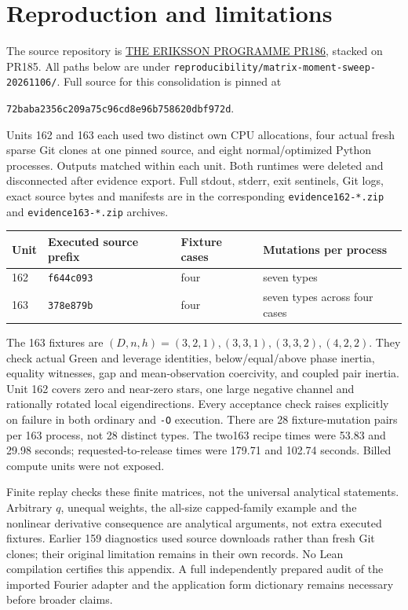 \documentclass[11pt,a4paper]{article}
\begin{document}
\section{Reproduction and limitations}\label{sec:evidence}
The source repository is
\href{https://github.com/lluiseriksson/THE-ERIKSSON-PROGRAMME/pull/186}{THE ERIKSSON PROGRAMME PR186},
stacked on PR185. All paths below are under
\texttt{reproducibility/matrix-moment-sweep-20261106/}.
Full source for this consolidation is pinned at
\begin{center}\small\texttt{72baba2356c209a75c96cd8e96b758620dbf972d}.\end{center}
Units 162 and 163 each used two distinct own CPU allocations, four actual
fresh sparse Git clones at one pinned source, and eight normal/optimized
Python processes. Outputs matched within each unit. Both runtimes were
deleted and disconnected after evidence export. Full stdout, stderr, exit
sentinels, Git logs, exact source bytes and manifests are in the corresponding
\texttt{evidence162-*.zip} and \texttt{evidence163-*.zip} archives.

\begin{center}\small
\begin{tabular}{llll}
\toprule
Unit & Executed source prefix & Fixture cases & Mutations per process\\
\midrule
162 & \texttt{f644c093} & four & seven types\\
163 & \texttt{378e879b} & four & seven types across four cases\\
\bottomrule
\end{tabular}
\end{center}
The 163 fixtures are $(D,n,h)=(3,2,1),(3,3,1),(3,3,2),(4,2,2)$.
They check actual Green and leverage identities, below/equal/above phase
inertia, equality witnesses, gap and mean-observation coercivity, and coupled
pair inertia. Unit 162 covers zero and near-zero stars, one large negative
channel and rationally rotated local eigendirections. Every acceptance check
raises explicitly on failure in both ordinary and \texttt{-O} execution.
There are 28 fixture-mutation pairs per 163 process, not 28 distinct types.
The two163 recipe times were 53.83 and 29.98 seconds; requested-to-release
times were 179.71 and 102.74 seconds. Billed compute units were not exposed.

Finite replay checks these finite matrices, not the universal analytical
statements. Arbitrary $q$, unequal weights, the all-size capped-family example
and the nonlinear derivative consequence are analytical arguments, not extra
executed fixtures. Earlier 159 diagnostics used source downloads rather than
fresh Git clones; their original limitation remains in their own records.
No Lean compilation certifies this appendix. A full independently prepared
audit of the imported Fourier adapter and the application form dictionary
remains necessary before broader claims.
\end{document}
